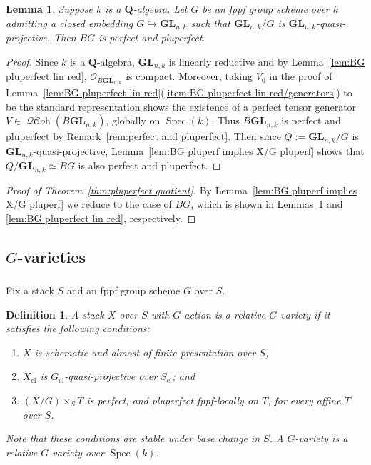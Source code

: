\documentclass[12pt, oneside]{amsart}
\numberwithin{equation}{section}
\newtheorem{definition}[subsubsection]{Definition}
\newtheorem{lemma}[subsubsection]{Lemma}
\theoremstyle{remark}
\theoremstyle{plain}
\DeclareMathOperator{\QCOH}{\mathcal{QC}\textit{oh}}
\newcommand{\OO}{\mathcal{O}}
\DeclareMathOperator{\spc}{Spec}
\newcommand{\GL}{\mathbf{GL}}
\newcommand{\bQ}{\mathbf{Q}}
\newcommand{\cl}{{\operatorname{cl}}}
\begin{document}
\begin{lemma}\label{lem:BG pluperfect char 0}
  Suppose $k$ is a $\bQ$-algebra.
  Let $G$ be an fppf group scheme over $k$ admitting a closed embedding $G \hookrightarrow \GL_{n,k}$ such that $\GL_{n,k}/G$ is $\GL_{n,k}$-quasi-projective.
  Then $BG$ is perfect and pluperfect.
\end{lemma}
\begin{proof}
  Since $k$ is a $\bQ$-algebra, $\GL_{n,k}$ is linearly reductive and by Lemma~\ref{lem:BG pluperfect lin red}, $\OO_{B\GL_{n,k}}$ is compact.
  Moreover, taking $V_0$ in the proof of Lemma~\ref{lem:BG pluperfect lin red}(\ref{item:BG pluperfect lin red/generators}) to be the standard representation shows the existence of a perfect tensor generator $V \in \QCOH(B\GL_{n,k})$, globally on $\spc(k)$.
  Thus $B\GL_{n,k}$ is perfect and pluperfect by Remark~\ref{rem:perfect and pluperfect}.
  Then since $Q := \GL_{n,k}/G$ is $\GL_{n,k}$-quasi-projective, Lemma~\ref{lem:BG pluperf implies X/G pluperf} shows that $Q/\GL_{n,k} \simeq BG$ is also perfect and pluperfect.
\end{proof}

\begin{proof}[Proof of Theorem~\ref{thm:pluperfect quotient}]
  By Lemma~\ref{lem:BG pluperf implies X/G pluperf} we reduce to the case of $BG$, which is shown in Lemmas~\ref{lem:BG pluperfect char 0} and \ref{lem:BG pluperfect lin red}, respectively.
\end{proof}

\subsection{$G$-varieties}\label{ssec:Var_G}

\subsubsection{}

Fix a stack $S$ and an fppf group scheme $G$ over $S$.

\begin{definition}\label{def:VarG}
  A stack $X$ over $S$ with $G$-action is a \emph{relative $G$-variety} if it satisfies the following conditions:
  \begin{enumerate}
	  \item $X$ is schematic and almost of finite presentation over $S$;
	  \item $X_\cl$ is $G_\cl$-quasi-projective over $S_\cl$; and
		\item $(X/G) \times_S T$ is perfect, and pluperfect fppf-locally on $T$, for every affine $T$ over $S$.
  \end{enumerate}
  Note that these conditions are stable under base change in $S$.
  A \emph{$G$-variety} is a relative $G$-variety over $\spc(k)$.
\end{definition}
\end{document}
